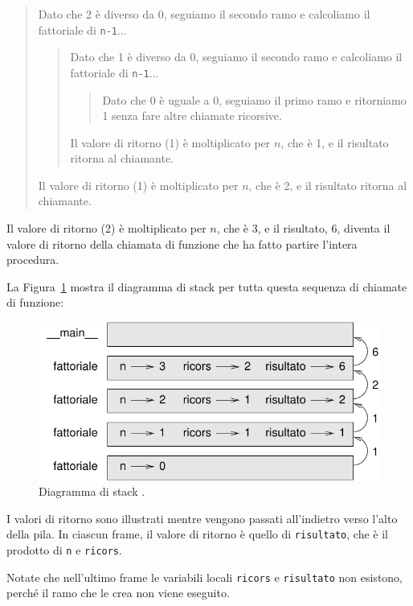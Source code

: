 \documentclass[10pt]{book}
\begin{document}
\begin{quote}
Dato che 2 è diverso da 0, seguiamo il secondo ramo e calcoliamo il fattoriale di {\tt n-1}...


  \begin{quote}
  Dato che 1 è diverso da 0, seguiamo il secondo ramo e calcoliamo il fattoriale di {\tt n-1}...


    \begin{quote}
    Dato che 0 è uguale a 0, seguiamo il primo ramo e ritorniamo 1 senza fare altre chiamate ricorsive.
    \end{quote}


  Il valore di ritorno (1) è moltiplicato per $n$, che è 1, e il risultato
     ritorna al chiamante.
  \end{quote}


Il valore di ritorno (1) è moltiplicato per $n$, che è 2, e il risultato
     ritorna al chiamante.
\end{quote}


Il valore di ritorno (2) è moltiplicato per $n$, che è 3, e il risultato, 6, diventa il valore di ritorno della chiamata di funzione che ha fatto partire l'intera procedura.

La Figura~\ref{fig.stack3} mostra il diagramma di stack per tutta questa sequenza di chiamate di funzione:

\begin{figure}
\centerline
{\includegraphics[scale=0.8]{figs/stack3.pdf}}
\caption{Diagramma di stack .}
\label{fig.stack3}
\end{figure}

I valori di ritorno sono illustrati mentre vengono passati all'indietro verso l'alto della pila. In ciascun frame, il valore di ritorno è quello di {\tt risultato}, che è il prodotto di {\tt n} e {\tt ricors}.

Notate che nell'ultimo frame le variabili locali {\tt ricors} e {\tt risultato} non esistono, perché il ramo che le crea non viene eseguito.
\end{document}
